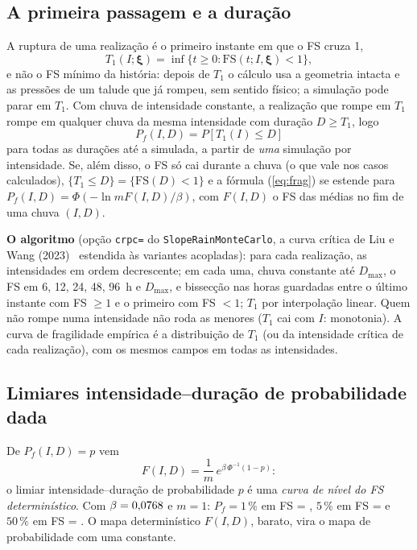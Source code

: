 \documentclass[11pt,a4paper]{article}
\newcommand{\Pf}{P_f}
\begin{document}
\subsection{A primeira passagem e a duração}\label{sec:t1}
A ruptura de uma realização é o primeiro instante em que o FS cruza 1,
\begin{equation}
T_1(I;\bm\xi) = \inf\{t \ge 0 : \mathrm{FS}(t; I, \bm\xi) < 1\},
\end{equation}
e não o FS mínimo da história: depois de $T_1$ o cálculo usa a geometria intacta e as pressões de um talude que já
rompeu, sem sentido físico; a simulação pode parar em $T_1$. Com chuva de intensidade constante, a realização que rompe
em $T_1$ rompe em qualquer chuva da mesma intensidade com duração $D \ge T_1$, logo
\begin{equation}
\Pf(I, D) = P[T_1(I) \le D]\label{eq:pfid}
\end{equation}
para todas as durações até a simulada, a partir de \emph{uma} simulação por intensidade. Se, além disso, o FS só cai
durante a chuva (o que vale nos casos calculados), $\{T_1 \le D\} = \{\mathrm{FS}(D) < 1\}$ e a fórmula
(\ref{eq:frag}) se estende para $\Pf(I, D) = \Phi(-\ln m F(I, D)/\beta)$, com $F(I, D)$ o FS das médias no fim de uma
chuva $(I, D)$.

\textbf{O algoritmo} (opção \texttt{crpc=} do \texttt{SlopeRainMonteCarlo}, a curva crítica de Liu e Wang (2023)~\cite{liuwang2023}
estendida às variantes acopladas): para cada realização, as intensidades em ordem decrescente; em cada uma, chuva
constante até $D_{\max}$, o FS em 6, 12, 24, 48, 96~h e $D_{\max}$, e bissecção nas horas guardadas entre o último
instante com FS $\ge 1$ e o primeiro com FS $< 1$; $T_1$ por interpolação linear. Quem não rompe numa intensidade não
roda as menores ($T_1$ cai com $I$: monotonia). A curva de fragilidade empírica é a distribuição de $T_1$ (ou da
intensidade crítica de cada realização), com os mesmos campos em todas as intensidades.

\subsection{Limiares intensidade--duração de probabilidade dada}\label{sec:limiares}
De $\Pf(I, D) = p$ vem
\begin{equation}
F(I, D) = \frac{1}{m}\,e^{\beta\,\Phi^{-1}(1-p)}:\label{eq:limiar}
\end{equation}
o limiar intensidade--duração de probabilidade $p$ é uma \emph{curva de nível do FS determinístico}. Com $\beta =
0{,}0768$ e $m = 1$: $\Pf = 1\,\%$ em FS = \nivelUm, $5\,\%$ em FS = \nivelCinco{} e $50\,\%$ em FS = \nivelCinquenta. O
mapa determinístico $F(I, D)$, barato, vira o mapa de probabilidade com uma constante.
\end{document}

